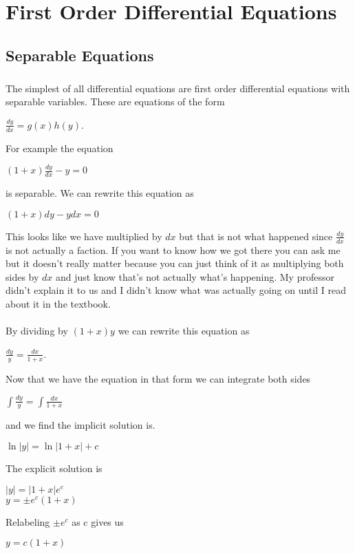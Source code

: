 \documentclass{report}
\begin{document}
    \chapter{First Order Differential Equations}
    \section{Separable Equations}
    \paragraph{}The simplest of all differential equations are first order differential equations with 
    separable variables. These are equations of the form 
    \begin{center}
        \(\frac{dy}{dx}=g(x)h(y)\).
    \end{center}
    For example the equation
    \begin{center}
        \((1+x)\frac{dy}{dx}-y=0\)
    \end{center}
    is separable. We can rewrite this equation as 
    \begin{center}
        \((1+x)dy-ydx=0\)
    \end{center}
    This looks like we have multiplied by \(dx\) but that is not what happened since \(\frac{dy}{dx}\) is not actually a faction. If you want to know how we got there you can ask me but 
    it doesn't really matter because you can just think of it as multiplying both sides by \(dx\) and just know that's not actually what's happening. My professor didn't explain it to us and I didn't know 
    what was actually going on until I read about it in the textbook.\\\\
    By dividing by \((1+x)y\) we can rewrite this equation as 
    \begin{center}
        \(\frac{dy}{y}=\frac{dx}{1+x}\).
    \end{center}
    Now that we have the equation in that form we can integrate both sides
    \begin{center}
        \(\int\frac{dy}{y}=\int\frac{dx}{1+x}\)
    \end{center}
    and we find the implicit solution is. 
    \begin{center}
        \(\ln|y|=\ln|1+x| + c\)
    \end{center}
    The explicit solution is 
    \begin{center}
        \(|y|=|1+x|e^c\)\\
        \(y=\pm e^c(1+x) \)
    \end{center}
    Relabeling \( \pm e^c \) as c gives us
    \begin{center}
        \( y=c(1+x) \)
    \end{center}
\end{document}
